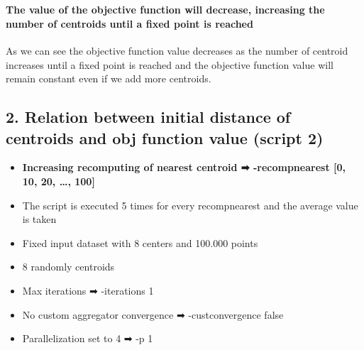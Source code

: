 \documentclass[11pt]{article}
\providecommand{\tightlist}{%
      \setlength{\itemsep}{0pt}\setlength{\parskip}{0pt}}
\begin{document}
    \begin{center}
    \end{center}
    { \hspace*{\fill} \\}
    
    \hypertarget{the-value-of-the-objective-function-will-decrease-increasing-the-number-of-centroids-until-a-fixed-point-is-reached}{%
\paragraph{The value of the objective function will decrease, increasing
the number of centroids until a fixed point is
reached}\label{the-value-of-the-objective-function-will-decrease-increasing-the-number-of-centroids-until-a-fixed-point-is-reached}}

As we can see the objective function value decreases as the number of
centroid increases until a fixed point is reached and the objective
function value will remain constant even if we add more centroids.

    \hypertarget{relation-between-initial-distance-of-centroids-and-obj-function-value-script-2}{%
\subsection{2. Relation between initial distance of centroids and obj
function value (script
2)}\label{relation-between-initial-distance-of-centroids-and-obj-function-value-script-2}}

\begin{itemize}
\tightlist
\item
  \textbf{Increasing recomputing of nearest centroid ➡ -recompnearest
  {[}0, 10, 20, \ldots{}, 100{]}}
\item
  The script is executed 5 times for every recompnearest and the average
  value is taken
\item
  Fixed input dataset with 8 centers and 100.000 points
\item
  8 randomly centroids
\item
  Max iterations ➡ -iterations 1
\item
  No custom aggregator convergence ➡ -custconvergence false
\item
  Parallelization set to 4 ➡ -p 1
\end{itemize}
\end{document}
